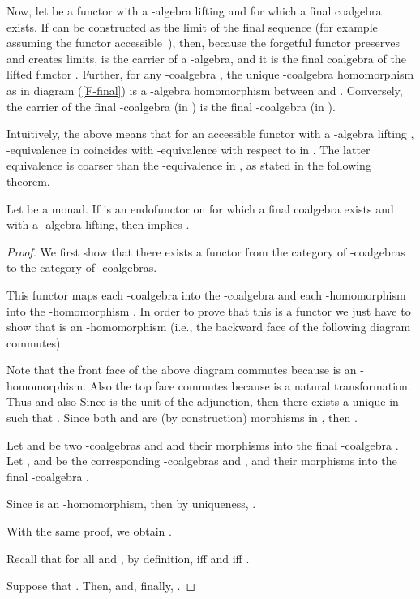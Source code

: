 \documentclass{LMCS}
\begin{document}
\medskip

Now, let  be a functor with a -algebra lifting and for which a final coalgebra  exists. If
 can be constructed as the limit of the final sequence (for example assuming the functor accessible~\cite{Ada74}),
then, because the forgetful functor  preserves and creates limits,  is the carrier
of a -algebra, and it is the final coalgebra of the lifted functor . Further,
for any -coalgebra , the unique -coalgebra homomorphism 
as in diagram (\ref{F-final}) is a -algebra homomorphism between  and .
Conversely, the carrier of the final -coalgebra (in ) is the final -coalgebra
(in ). 

Intuitively, the above means that for an accessible functor  with a -algebra
lifting , -equivalence in  coincides with -equivalence
with respect to  in . The latter equivalence is coarser than the
-equivalence in , as stated in the following theorem.
\begin{thm}\label{thm:main}
Let  be a monad. If  is an endofunctor on  for which a final coalgebra exists and with a -algebra lifting,
then  implies .
\end{thm}
\begin{proof}
We first show that there exists a functor from the category of
-coalgebras to the category of -coalgebras.

This functor maps each -coalgebra  into the -coalgebra
 and each -homomorphism 
into the -homomorphism .
In order to prove that this is a functor we just have to show that
 is an -homomorphism (i.e., the backward face of the
following diagram commutes).





Note that the front face of the above diagram commutes because  is
an -homomorphism. Also the top face commutes because  is
a natural transformation. Thus 
 and also  
Since  is the
unit of the adjunction, then there exists a unique
 in  such that . Since both  and
 are (by construction) morphisms in
, then .

Let  and  be two -coalgebras and  and  their morphisms into the final -coalgebra .
Let ,  and  be the corresponding -coalgebras and ,  and 
their morphisms into the final -coalgebra .


Since  is an -homomorphism, then by uniqueness,
.


\begin{center}

\end{center}


With the same proof, we obtain . 

Recall that for all  and , by definition,
 iff  and  iff .

Suppose that . Then,  and, finally,
.
\end{proof}
\end{document}
